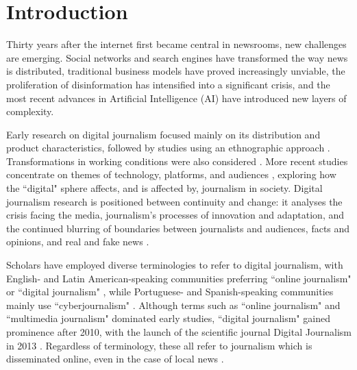 \documentclass[english]{textolivre}
\begin{document}
\begin{polyabstract}
\begin{portuguese}
\begin{abstract}
\end{abstract}
\end{portuguese}
\end{polyabstract}

\section{Introduction}
Thirty years after the internet first became central in newsrooms, new challenges are emerging. Social networks and search engines have transformed the way news is distributed, traditional business models have proved increasingly unviable, the proliferation of disinformation has intensified into a significant crisis, and the most recent advances in Artificial Intelligence (AI) have introduced new layers of complexity.

Early research on digital journalism focused mainly on its distribution and product characteristics, followed by studies using an ethnographic approach \cite{jeronimo2015}. Transformations in working conditions were also considered \cite{deuze2009, morais2020}. More recent studies concentrate on themes of technology, platforms, and audiences \cite{steensen2019}, exploring how the ``digital" sphere affects, and is affected by, journalism in society. Digital journalism research is positioned between continuity and change: it analyses the crisis facing the media, journalism’s processes of innovation and adaptation, and the continued blurring of boundaries between journalists and audiences, facts and opinions, and real and fake news \cite{eldridge2019, westlund2023}.

Scholars have employed diverse terminologies to refer to digital journalism, with English- and Latin American-speaking communities preferring ``online journalism" or ``digital journalism" \cite{boczkowski2004, westlund2023, eldridge2019}, while Portuguese- and Spanish-speaking communities mainly use ``cyberjournalism" \cite{bastos2023, jeronimo2015, diaz2003, lopez-garcia2008}. Although terms such as ``online journalism" and ``multimedia journalism" dominated early studies, ``digital journalism" gained prominence after 2010, with the launch of the scientific journal Digital Journalism in 2013 \cite{steensen2019}. Regardless of terminology, these all refer to journalism which is disseminated online, even in the case of local news \cite{jeronimo2015}.
\end{document}
